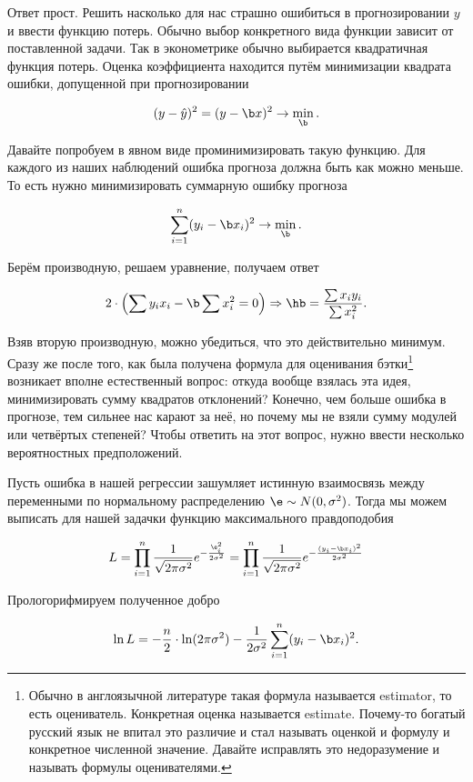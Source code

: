 Ответ прост. Решить насколько для нас страшно ошибиться в прогнозировании $y$ и ввести функцию потерь. Обычно выбор конкретного вида функции зависит от поставленной задачи.  Так в эконометрике обычно выбирается квадратичная функция потерь. Оценка коэффициента находится путём минимизации квадрата ошибки, допущенной при прогнозировании

\[ (y - \hat y)^2 = (y - \b x)^2 \to \min_{\b}. \]

Давайте попробуем в явном виде проминимизировать такую функцию. Для каждого из наших наблюдений ошибка прогноза должна быть как можно меньше. То есть нужно минимизировать суммарную ошибку прогноза 

\[  \sum_{i=1}^n(y_i - \b x_i)^2  \to \min_{\b}.  \]

Берём производную, решаем уравнение, получаем ответ

\begin{equation*}
2 \cdot \left(\sum y_i x_i - \b \sum x_i^2  = 0 \right) \Rightarrow \hb = \frac{\sum x_i y_i}{\sum x_i^2}.
\end{equation*}

Взяв вторую производную, можно убедиться, что это действительно минимум.  Сразу же после того, как была получена формула для оценивания бэтки\footnote{Обычно в англоязычной литературе такая формула называется estimator, то есть оцениватель. Конкретная оценка называется estimate. Почему-то богатый русский язык не впитал это различие и стал называть оценкой и формулу и конкретное численной значение. Давайте исправлять это недоразумение и называть формулы оценивателями.} возникает вполне естественный вопрос: откуда вообще взялась эта идея, минимизировать сумму квадратов отклонений?  Конечно, чем больше ошибка в прогнозе, тем сильнее нас карают за неё, но почему мы не взяли сумму модулей или четвёртых степеней?  Чтобы ответить на этот вопрос, нужно ввести несколько вероятностных предположений. 

Пусть ошибка в нашей регрессии  зашумляет истинную взаимосвязь между переменными по нормальному распределению $\e \sim N(0, \sigma^2)$. Тогда мы можем выписать для нашей задачки функцию максимального правдоподобия

\[ L =  \prod_{i=1}^{n} \frac{1}{\sqrt{2\pi \sigma^2}} e^{- \frac{\e_i^2}{2 \sigma^2}   } =  \prod_{i=1}^{n} \frac{1}{\sqrt{2\pi \sigma^2}} e^{- \frac{(y_i - \b x_i)^2}{2 \sigma^2}   } \]

Прологорифмируем полученное добро

\[ \ln L = -\frac{n}{2} \cdot \ln(2 \pi \sigma^2) - \frac{1}{2\sigma^2} \sum_{i=1}^n (y_i - \b x_i)^2. \]

